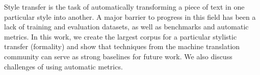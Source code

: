 Style transfer is the task of automatically transforming a piece of text in one particular style into another.   A major barrier to progress in this field has been a lack of training and evaluation datasets, as well as benchmarks and automatic metrics.  In this work, we create the largest corpus for a particular stylistic transfer (formality) and show that techniques from the machine translation community can serve as strong baselines for future work.  We also discuss challenges of using automatic metrics.
